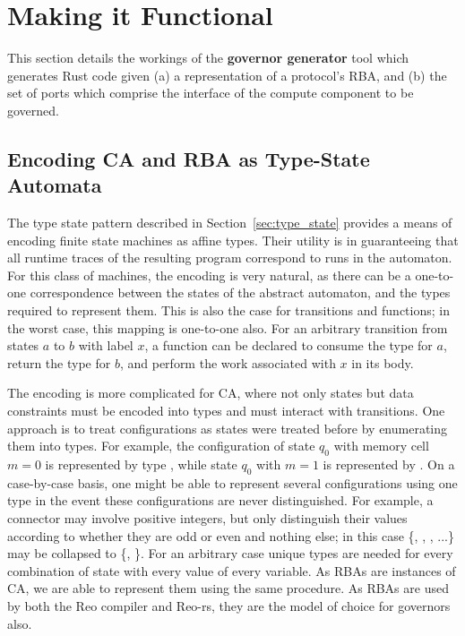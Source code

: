\section{Making it Functional}
\label{sec:making_it_functional}
This section details the workings of the \textbf{governor generator} tool which generates Rust code given (a) a representation of a protocol's RBA, and (b) the set of ports which comprise the interface of the compute component to be governed.

\subsection{Encoding CA and RBA as Type-State Automata}
\label{sec:type_space_automaton}
The type state pattern described in Section~\ref{sec:type_state} provides a means of encoding finite state machines as affine types. Their utility is in guaranteeing that all runtime traces of the resulting program correspond to runs in the automaton. For this class of machines, the encoding is very natural, as there can be a one-to-one correspondence between the states of the abstract automaton, and the types required to represent them. This is also the case for transitions and functions; in the worst case, this mapping is one-to-one also. For an arbitrary transition from states $a$ to $b$ with label $x$, a function can be declared to consume the type for $a$, return the type for $b$, and perform the work associated with $x$ in its body. 

The encoding is more complicated for CA, where not only states but data constraints must be encoded into types and must interact with transitions. One approach is to treat configurations as states were treated before by enumerating them into types. For example, the configuration of state $q_0$ with memory cell $m=0$ is represented by type , while state $q_0$ with $m=1$ is represented by . On a case-by-case basis, one might be able to represent several configurations using one type in the event these configurations are never distinguished. For example, a connector may involve positive integers, but only distinguish their values according to whether they are odd or even and nothing else; in this case \{, , , ...\} may be collapsed to \{, \}. For an arbitrary case unique types are needed for every combination of state with every value of every variable. As RBAs are instances of CA, we are able to represent them using the same procedure. As RBAs are used by both the Reo compiler and Reo-rs, they are the model of choice for governors also. 

